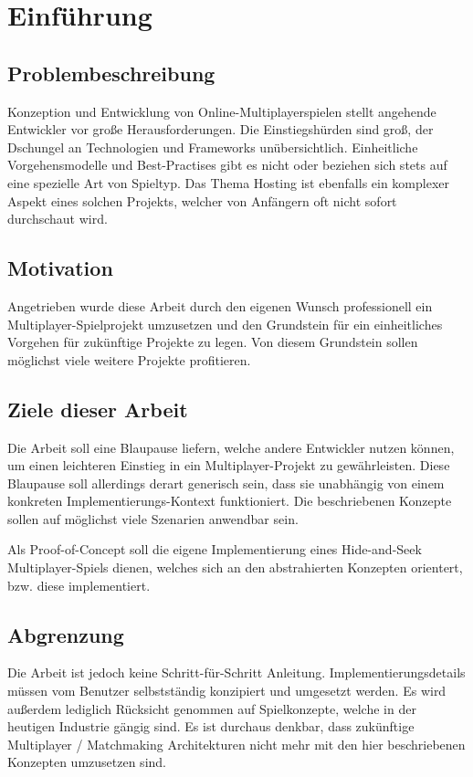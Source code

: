 \chapter{Einführung}

\section{Problembeschreibung}

Konzeption und Entwicklung von Online-Multiplayerspielen stellt angehende Entwickler vor große Herausforderungen. Die Einstiegshürden sind groß, der Dschungel an Technologien und Frameworks unübersichtlich. Einheitliche Vorgehensmodelle und Best-Practises gibt es nicht oder beziehen sich stets auf eine spezielle Art von Spieltyp. Das Thema Hosting ist ebenfalls ein komplexer Aspekt eines solchen Projekts, welcher von Anfängern oft nicht sofort durchschaut wird.

\section{Motivation}

Angetrieben wurde diese Arbeit durch den eigenen Wunsch professionell ein Multiplayer-Spielprojekt umzusetzen und den Grundstein für ein einheitliches Vorgehen für zukünftige Projekte zu legen. Von diesem Grundstein sollen möglichst viele weitere Projekte profitieren.

\section{Ziele dieser Arbeit}

Die Arbeit soll eine Blaupause liefern, welche andere Entwickler nutzen können, um einen leichteren Einstieg in ein Multiplayer-Projekt zu gewährleisten. Diese Blaupause soll allerdings derart generisch sein, dass sie unabhängig von einem konkreten Implementierungs-Kontext funktioniert. Die beschriebenen Konzepte sollen auf möglichst viele Szenarien anwendbar sein.

Als Proof-of-Concept soll die eigene Implementierung eines Hide-and-Seek Multiplayer-Spiels dienen, welches sich an den abstrahierten Konzepten orientert, bzw. diese implementiert.

\section{Abgrenzung}

Die Arbeit ist jedoch keine Schritt-für-Schritt Anleitung. Implementierungsdetails müssen vom Benutzer selbstständig konzipiert und umgesetzt werden. Es wird außerdem lediglich Rücksicht genommen auf Spielkonzepte, welche in der heutigen Industrie gängig sind. Es ist durchaus denkbar, dass zukünftige Multiplayer / Matchmaking Architekturen nicht mehr mit den hier beschriebenen Konzepten umzusetzen sind.


